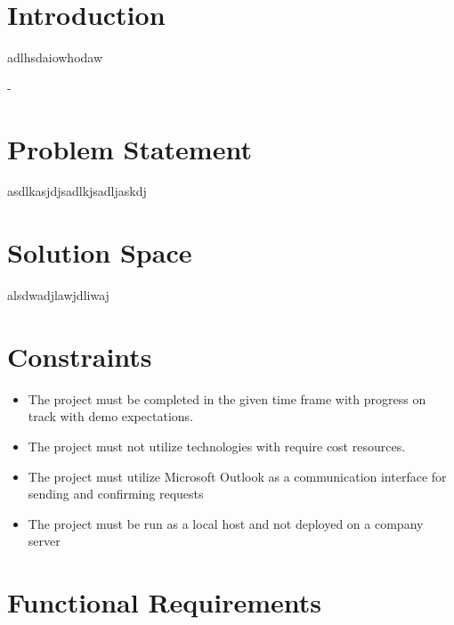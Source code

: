 \documentclass{article}
\begin{document}
    \newpage
    

\section{Introduction}
  \begin{paragraph}
    adlhsdaiowhodaw
  \end{paragraph}
 
-  \section {Problem Statement}
  \begin{paragraph}
    asdlkasjdjsadlkjsadljaskdj
  \end{paragraph}
    
  \section {Solution Space}
  \begin{paragraph}
    alsdwadjlawjdliwaj
  \end{paragraph}
  
   \section{Constraints}
    \begin{itemize}
        \item The project must be completed in the given time frame with progress on        track with demo expectations.
        \item The project must not utilize technologies with require cost resources.
        \item The project must utilize Microsoft Outlook as a communication interface       for sending and confirming requests
        \item The project must be run as a local host and not deployed on a company         server
    \end{itemize}
    
  
  \section{Functional Requirements}
\end{document}
